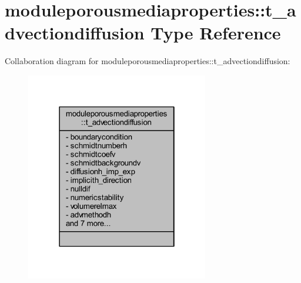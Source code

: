 \hypertarget{structmoduleporousmediaproperties_1_1t__advectiondiffusion}{}\section{moduleporousmediaproperties\+:\+:t\+\_\+advectiondiffusion Type Reference}
\label{structmoduleporousmediaproperties_1_1t__advectiondiffusion}


Collaboration diagram for moduleporousmediaproperties\+:\+:t\+\_\+advectiondiffusion\+:\nopagebreak
\begin{figure}[H]
\begin{center}
\leavevmode
\includegraphics[width=226pt]{structmoduleporousmediaproperties_1_1t__advectiondiffusion__coll__graph}
\end{center}
\end{figure}
